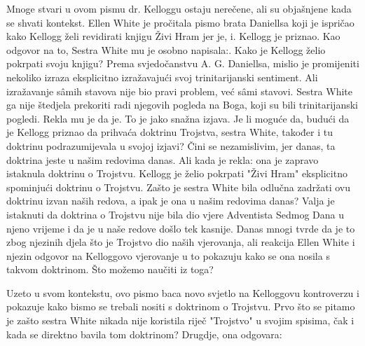 Mnoge stvari u ovom pismu dr. Kelloggu ostaju nerečene, ali su objašnjene kada se shvati kontekst. Ellen White je pročitala pismo brata Daniellsa koji je ispričao kako Kellogg želi revidirati knjigu Živi Hram jer je, i. Kellogg je priznao. Kao odgovor na to, Sestra White mu je osobno napisala:. Kako je Kellogg želio pokrpati svoju knjigu? Prema svjedočanstvu A. G. Daniellsa, mislio je promijeniti nekoliko izraza eksplicitno izražavajući svoj trinitarijanski sentiment. Ali izražavanje sâmih stavova nije bio pravi problem, već sâmi stavovi. Sestra White ga nije štedjela prekoriti radi njegovih pogleda na Boga, koji su bili trinitarijanski pogledi. Rekla mu je da je. To je jako snažna izjava. Je li moguće da, budući da je Kellogg priznao da prihvaća doktrinu Trojstva, sestra White, također i tu doktrinu podrazumijevala u svojoj izjavi? Čini se nezamislivim, jer danas, ta doktrina jeste u našim redovima danas. Ali kada je rekla: ona je zapravo istaknula doktrinu o Trojstvu. Kellogg je želio pokrpati "Živi Hram" eksplicitno spominjući doktrinu o Trojstvu. Zašto je sestra White bila odlučna zadržati ovu doktrinu izvan naših redova, a ipak je ona u našim redovima danas? Valja je istaknuti da doktrina o Trojstvu nije bila dio vjere Adventista Sedmog Dana u njeno vrijeme i da je u naše redove došlo tek kasnije. Danas mnogi tvrde da je to zbog njezinih djela što je Trojstvo dio naših vjerovanja, ali reakcija Ellen White i njezin odgovor na Kelloggovo vjerovanje u to pokazuju kako se ona nosila s takvom doktrinom. Što možemo naučiti iz toga?

Uzeto u svom kontekstu, ovo pismo baca novo svjetlo na Kelloggovu kontroverzu i pokazuje kako bismo se trebali nositi s doktrinom o Trojstvu. Prvo što se pitamo je zašto sestra White nikada nije koristila riječ "Trojstvo" u svojim spisima, čak i kada se direktno bavila tom doktrinom? Drugdje, ona odgovara:

